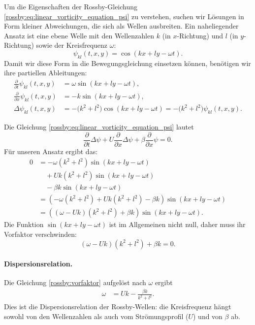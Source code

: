 Um die Eigenschaften der Rossby-Gleichung \eqref{rossby:eq:linear_vorticity_equation_psi}
zu verstehen, suchen wir Lösungen in Form kleiner Abweichungen,
die sich als Wellen ausbreiten. Ein naheliegender Ansatz ist eine
ebene Welle mit den Wellenzahlen $k$ (in $x$-Richtung) und $l$
(in $y$-Richtung) sowie der Kreisfrequenz $\omega$:
\begin{equation}
	\psi_{kl}(t,x,y) = \cos(kx + ly - \omega t).
	\label{rossby:ebenewelle}
\end{equation}
Damit wir diese Form in die Bewegungsgleichung einsetzen können,
benötigen wir ihre partiellen Ableitungen:
\begin{align*}
	\frac{\partial}{\partial t} \psi_{kl}(t,x,y)
	 & = \omega \sin(kx+ly-\omega t),
	\\[0.5em]
	\frac{\partial}{\partial x} \psi_{kl}(t,x,y)
	 & = -k \sin(kx+ly-\omega t),
	\\[0.5em]
	\Delta\psi_{kl}(t,x,y)
	 & = -\bigl(k^2+l^2\bigr)\cos(kx+ly-\omega t)
	= -\bigl(k^2+l^2\bigr)\psi_{kl}(t,x,y).
\end{align*}

Die Gleichung  \eqref{rossby:eq:linear_vorticity_equation_psi} lautet
\[
	\frac{\partial}{\partial t}\Delta \psi
	+ U \frac{\partial}{\partial x}\Delta \psi
	+ \beta \frac{\partial}{\partial x} \psi = 0.
\]
Für unseren Ansatz ergibt das:
\begin{align*}
	0
	 & = -\omega (k^2+l^2)\sin(kx+ly-\omega t)
	\\&\quad
	+ U k (k^2+l^2)\sin(kx+ly-\omega t)
	\\&\quad
	- \beta k \sin(kx+ly-\omega t) \\
	&= \left( -\omega (k^2+l^2) + Uk (k^2+l^2) - \beta k \right) \sin(kx+ly-\omega t) \\
	&= \left( (\omega - Uk)(k^2+l^2) + \beta k \right) \sin(kx+ly-\omega t).
\end{align*}
Die Funktion $\sin(kx+ly-\omega t)$ ist im Allgemeinen nicht null,
daher muss ihr Vorfaktor verschwinden:
\begin{equation}
	(\omega - Uk)(k^2+l^2) + \beta k = 0.
	\label{rossby:vorfaktor}
\end{equation}

\paragraph{Dispersionsrelation.}
Die Gleichung \eqref{rossby:vorfaktor} aufgelöst nach $\omega$ ergibt
\begin{align}
	\omega
	 & = Uk - \frac{\beta k}{k^2+l^2}.
	\label{rossby:dispersion}
\end{align}
Dies ist die Dispersionsrelation der Rossby-Wellen:
die Kreisfrequenz hängt sowohl von den Wellenzahlen
als auch vom Strömungsprofil ($U$) und von $\beta$ ab.

